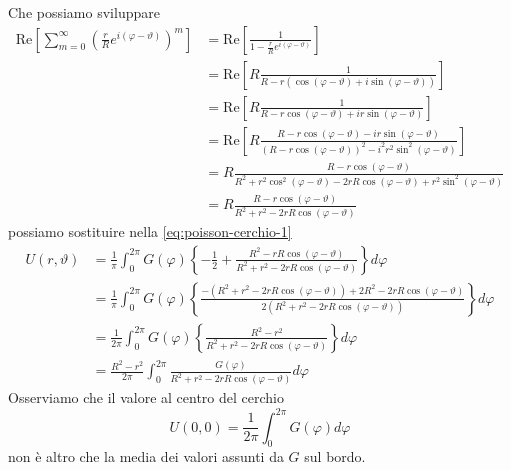 \documentclass[10pt,a4paper,twoside,openright]{book}
\begin{document}
\begin{dimostrazione}
\begin{equation*}
\end{equation*}
Che possiamo sviluppare
\begin{align*}
\mathrm{Re}\left[\sum\limits ^{\infty }_{m=0}\left(\frac{r}{R} e^{i(\varphi -\vartheta)}\right)^{m}\right] & =\mathrm{Re}\left[\frac{1}{1-\frac{r}{R} e^{i(\varphi -\vartheta)}}\right]\\
 & =\mathrm{Re}\left[ R\frac{1}{R-r(\cos(\varphi -\vartheta) +i\sin(\varphi -\vartheta))}\right]\\
 & =\mathrm{Re}\left[ R\frac{1}{R-r\cos(\varphi -\vartheta) +ir\sin(\varphi -\vartheta)}\right]\\
 & =\mathrm{Re}\left[ R\frac{R-r\cos(\varphi -\vartheta) -ir\sin(\varphi -\vartheta)}{(R-r\cos(\varphi -\vartheta))^{2} -i^{2} r^{2}\sin^{2}(\varphi -\vartheta)}\right]\\
 & =R\frac{R-r\cos(\varphi -\vartheta)}{R^{2} +r^{2}\cos^{2}(\varphi -\vartheta) -2rR\cos(\varphi -\vartheta) +r^{2}\sin^{2}(\varphi -\vartheta)}\\
 & =R\frac{R-r\cos(\varphi -\vartheta)}{R^{2} +r^{2} -2rR\cos(\varphi -\vartheta)}
\end{align*}
possiamo sostituire nella \eqref{eq:poisson-cerchio-1}
\begin{align*}
U(r,\vartheta) & =\frac{1}{\pi }\int ^{2\pi }_{0} G(\varphi)\left\{-\frac{1}{2} +\frac{R^{2} -rR\cos(\varphi -\vartheta)}{R^{2} +r^{2} -2rR\cos(\varphi -\vartheta)}\right\} d\varphi \\
 & =\frac{1}{\pi }\int ^{2\pi }_{0} G(\varphi)\left\{\frac{-\left(R^{2} +r^{2} -2rR\cos(\varphi -\vartheta)\right) +2R^{2} -2rR\cos(\varphi -\vartheta)}{2\left(R^{2} +r^{2} -2rR\cos(\varphi -\vartheta)\right)}\right\} d\varphi \\
 & =\frac{1}{2\pi }\int ^{2\pi }_{0} G(\varphi)\left\{\frac{R^{2} -r^{2}}{R^{2} +r^{2} -2rR\cos(\varphi -\vartheta)}\right\} d\varphi \\
 & =\frac{R^{2} -r^{2}}{2\pi }\int ^{2\pi }_{0}\frac{G(\varphi)}{R^{2} +r^{2} -2rR\cos(\varphi -\vartheta)} d\varphi 
\end{align*}
Osserviamo che il valore al centro del cerchio
\begin{equation*}
U(0,0) =\frac{1}{2\pi }\int ^{2\pi }_{0} G(\varphi) d\varphi 
\end{equation*}
non è altro che la media dei valori assunti da $G$ sul bordo.


\end{dimostrazione}
\end{document}
